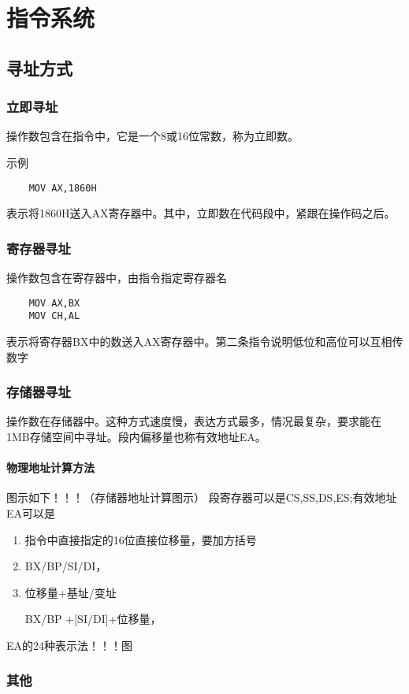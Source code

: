 \chapter{指令系统}
\section{寻址方式}
\subsection{立即寻址}
操作数包含在指令中，它是一个8或16位常数，称为立即数。

示例
\begin{lstlisting}
    MOV AX,1860H
\end{lstlisting}
表示将1860H送入AX寄存器中。其中，立即数在代码段中，紧跟在操作码之后。
\subsection{寄存器寻址}
操作数包含在寄存器中，由指令指定寄存器名
\begin{lstlisting}
    MOV AX,BX
    MOV CH,AL
\end{lstlisting}
表示将寄存器BX中的数送入AX寄存器中。第二条指令说明低位和高位可以互相传数字
\subsection{存储器寻址}
操作数在存储器中。这种方式速度慢，表达方式最多，情况最复杂，要求能在1MB存储空间中寻址。段内偏移量也称有效地址EA。
\subsubsection{物理地址计算方法}
图示如下！！！（存储器地址计算图示）
段寄存器可以是CS,SS,DS,ES;有效地址EA可以是
\begin{enumerate}
    \item 指令中直接指定的16位直接位移量，要加方括号
    \item BX/BP/SI/DI，{\color{red}{出现BP（不管是源处还是目的处）时默认使用SS提供段基址，但允许使用段超越前缀将SS修改为CS/DS/E，没有BP的，默认使用DS}}
    \item 位移量+基址/变址
    \item [BX/BP]+[SI/DI]+位移量，{\color{red}{画斜线的两者不能同时出现}}
\end{enumerate}
EA的24种表示法！！！图

\subsection{其他}
